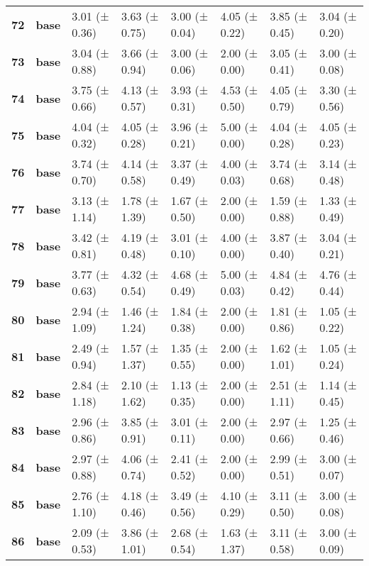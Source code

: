 \begin{longtable}{llllllll}
\cline{1-8}
\textbf{72} & \textbf{base} & 3.01 (± 0.36) & 3.63 (± 0.75) & 3.00 (± 0.04) & 4.05 (± 0.22) & 3.85 (± 0.45) & 3.04 (± 0.20) \\
\cline{1-8}
\textbf{73} & \textbf{base} & 3.04 (± 0.88) & 3.66 (± 0.94) & 3.00 (± 0.06) & 2.00 (± 0.00) & 3.05 (± 0.41) & 3.00 (± 0.08) \\
\cline{1-8}
\textbf{74} & \textbf{base} & 3.75 (± 0.66) & 4.13 (± 0.57) & 3.93 (± 0.31) & 4.53 (± 0.50) & 4.05 (± 0.79) & 3.30 (± 0.56) \\
\cline{1-8}
\textbf{75} & \textbf{base} & 4.04 (± 0.32) & 4.05 (± 0.28) & 3.96 (± 0.21) & 5.00 (± 0.00) & 4.04 (± 0.28) & 4.05 (± 0.23) \\
\cline{1-8}
\textbf{76} & \textbf{base} & 3.74 (± 0.70) & 4.14 (± 0.58) & 3.37 (± 0.49) & 4.00 (± 0.03) & 3.74 (± 0.68) & 3.14 (± 0.48) \\
\cline{1-8}
\textbf{77} & \textbf{base} & 3.13 (± 1.14) & 1.78 (± 1.39) & 1.67 (± 0.50) & 2.00 (± 0.00) & 1.59 (± 0.88) & 1.33 (± 0.49) \\
\cline{1-8}
\textbf{78} & \textbf{base} & 3.42 (± 0.81) & 4.19 (± 0.48) & 3.01 (± 0.10) & 4.00 (± 0.00) & 3.87 (± 0.40) & 3.04 (± 0.21) \\
\cline{1-8}
\textbf{79} & \textbf{base} & 3.77 (± 0.63) & 4.32 (± 0.54) & 4.68 (± 0.49) & 5.00 (± 0.03) & 4.84 (± 0.42) & 4.76 (± 0.44) \\
\cline{1-8}
\textbf{80} & \textbf{base} & 2.94 (± 1.09) & 1.46 (± 1.24) & 1.84 (± 0.38) & 2.00 (± 0.00) & 1.81 (± 0.86) & 1.05 (± 0.22) \\
\cline{1-8}
\textbf{81} & \textbf{base} & 2.49 (± 0.94) & 1.57 (± 1.37) & 1.35 (± 0.55) & 2.00 (± 0.00) & 1.62 (± 1.01) & 1.05 (± 0.24) \\
\cline{1-8}
\textbf{82} & \textbf{base} & 2.84 (± 1.18) & 2.10 (± 1.62) & 1.13 (± 0.35) & 2.00 (± 0.00) & 2.51 (± 1.11) & 1.14 (± 0.45) \\
\cline{1-8}
\textbf{83} & \textbf{base} & 2.96 (± 0.86) & 3.85 (± 0.91) & 3.01 (± 0.11) & 2.00 (± 0.00) & 2.97 (± 0.66) & 1.25 (± 0.46) \\
\cline{1-8}
\textbf{84} & \textbf{base} & 2.97 (± 0.88) & 4.06 (± 0.74) & 2.41 (± 0.52) & 2.00 (± 0.00) & 2.99 (± 0.51) & 3.00 (± 0.07) \\
\cline{1-8}
\textbf{85} & \textbf{base} & 2.76 (± 1.10) & 4.18 (± 0.46) & 3.49 (± 0.56) & 4.10 (± 0.29) & 3.11 (± 0.50) & 3.00 (± 0.08) \\
\cline{1-8}
\textbf{86} & \textbf{base} & 2.09 (± 0.53) & 3.86 (± 1.01) & 2.68 (± 0.54) & 1.63 (± 1.37) & 3.11 (± 0.58) & 3.00 (± 0.09) \\

\end{longtable}
